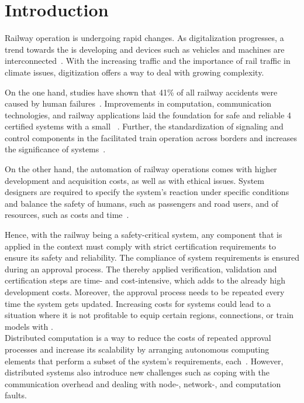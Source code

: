 \chapter{Introduction}


Railway operation is undergoing rapid changes.
%
As digitalization progresses, a trend towards the  is developing and devices such as vehicles and machines are interconnected~\cite{RailwayDigitalization}.
With the increasing traffic and the importance of rail traffic in climate issues, digitization offers a way to deal with growing complexity.

On the one hand, studies have shown that 41\% of all railway accidents were caused by human failures~\cite{StudyRailwayAccidents}.
Improvements in computation, communication technologies, and railway applications laid the foundation for safe and reliable  4 certified  systems with a small ~\cite{SallekSIL}.
Further, the standardization of signaling and control components in the  facilitated train operation across borders and increases the significance of  systems~\cite{YIN2017RNDofATO}.

On the other hand, the automation of railway operations comes with higher development and acquisition costs, as well as with ethical issues.
System designers are required to specify the system's reaction under specific conditions and balance the safety of humans, such as passengers and road users, and of resources, such as costs and time~\cite{EthicsInSafety}.

Hence, with the railway being a safety-critical system, any component that is applied in the  context must comply with strict certification requirements to ensure its safety and reliability.
The compliance of system requirements is ensured during an approval process.
The thereby applied verification, validation and certification steps are time- and cost-intensive, which adds to the already high development costs.
Moreover, the approval process needs to be repeated every time the system gets updated.
Increasing costs for  systems could lead to a situation where it is not profitable to equip certain regions, connections, or train models with .
\\

Distributed computation is a way to reduce the costs of repeated approval processes and increase its scalability by arranging autonomous computing elements that perform a subset of the system's requirements, each~\cite{DistributedSafety2020}.
However, distributed systems also introduce new challenges such as coping with the communication overhead and dealing with node-, network-, and computation faults.

